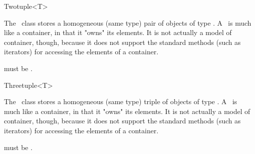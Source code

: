 \begin{ccRefClass}{Twotuple<T>}
  
  \ccDefinition The \ccRefName\ class stores a homogeneous (same type) pair
  of objects of type .  A \ccRefName\ is much like a container, in that
  it "owns" its elements. It is not actually a model of container, though,
  because it does not support the standard methods (such as iterators) for
  accessing the elements of a container.

  
  \ccRequirements {} must be .


  \ccTypes

  \ccGlue

  \ccCreation
  
  
  
\end{ccRefClass}


\begin{ccRefClass}{Threetuple<T>}
  
  \ccDefinition The \ccRefName\ class stores a homogeneous (same type) triple
  of objects of type .  A \ccRefName\ is much like a container, in that
  it "owns" its elements. It is not actually a model of container, though,
  because it does not support the standard methods (such as iterators) for
  accessing the elements of a container.

  
  \ccRequirements {} must be .


  \ccTypes

  \ccGlue
  \ccGlue

  \ccCreation
  
  
  
\end{ccRefClass}

